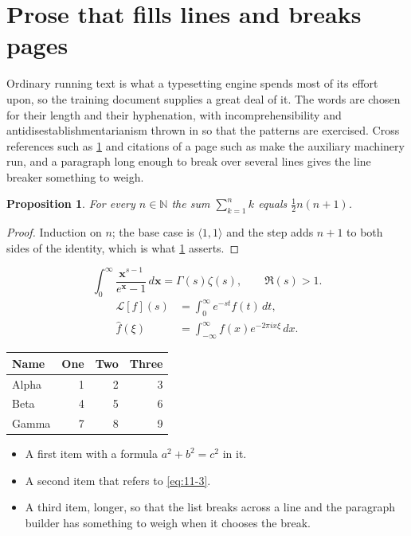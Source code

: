 \documentclass[11pt,a4paper]{report}
\theoremstyle{plain}
\newtheorem{proposition}{Proposition}[chapter]
\newcommand{\vecn}[1]{\mathbf{#1}}
\newcommand{\pairs}[2]{\langle #1,#2\rangle}
\begin{document}
\section{Prose that fills lines and breaks pages}
\label{sec:prose11-3}
Ordinary running text is what a typesetting engine spends most of its effort
upon, so the training document supplies a great deal of it. The words are
chosen for their length and their hyphenation, with incomprehensibility and
antidisestablishmentarianism thrown in so that the patterns are exercised.
Cross references such as \cref{sec:prose11-3} and citations of a page such
as \pageref{sec:prose11-3} make the auxiliary machinery run, and a
paragraph long enough to break over several lines gives the line breaker
something to weigh.
\begin{proposition}\label{prop:11-3}
For every $n\in\mathbb{N}$ the sum $\sum_{k=1}^{n}k$ equals
$\tfrac{1}{2}n(n+1)$.
\end{proposition}
\begin{proof}
Induction on $n$; the base case is $\pairs{1}{1}$ and the step adds $n+1$ to
both sides of the identity, which is what \cref{prop:11-3} asserts.
\end{proof}
\begin{equation}\label{eq:11-3}
  \int_{0}^{\infty}\frac{\vecn{x}^{s-1}}{e^{\vecn{x}}-1}\,d\vecn{x}
    = \Gamma(s)\zeta(s),\qquad \Re(s)>1 .
\end{equation}
\begin{align}
  \mathcal{L}[f](s) &= \int_{0}^{\infty} e^{-st} f(t)\,dt, \\
  \widehat{f}(\xi)  &= \int_{-\infty}^{\infty} f(x) e^{-2\pi i x\xi}\,dx .
\end{align}
\par\noindent\begin{center}
\begin{tabular}{lrrr}
\hline
Name & One & Two & Three \\
\hline
Alpha & 1 & 2 & 3 \\
Beta & 4 & 5 & 6 \\
Gamma & 7 & 8 & 9 \\
\hline
\end{tabular}
\end{center}
\begin{itemize}
  \item A first item with a formula $a^2+b^2=c^2$ in it.
  \item A second item that refers to \eqref{eq:11-3}.
  \item A third item, longer, so that the list breaks across a line and the
    paragraph builder has something to weigh when it chooses the break.
\end{itemize}
\end{document}
